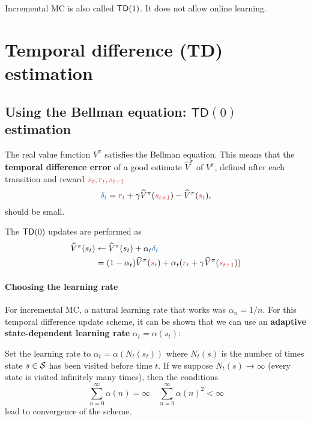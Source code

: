 \documentclass[../course-notes.tex]{subfiles}
\begin{document}
Incremental MC is also called $\mathsf{TD}(1)$. It does not allow online learning.



\section{Temporal difference (TD) estimation}

\subsection{Using the Bellman equation: $\mathsf{TD}(0)$ estimation}

The real value function $V^\pi$ satisfies the Bellman equation. This means that the \textbf{\bluefont temporal difference error} of a good estimate $\widehat{V}^\pi$ of $V^\pi$, defined after each transition and reward ${\redfont s_t,r_t,s_{t+1}}$
\begin{equation}\label{eq:ValueTDerror}
	{\bluefont\delta_t} = {\redfont r_t} + \gamma \widehat{V}^\pi({\redfont s_{t+1}}) - \widehat{V}^\pi({\redfont s_t}),
\end{equation}
should be small.

The $\mathsf{TD}(0)$ updates are performed as
\begin{align*}
	\widehat{V}^\pi(s_t) &\leftarrow
	\widehat{V}^\pi(s_t) + \alpha_t {\bluefont \delta_t} \\
	&= (1 - \alpha_t)\widehat{V}^\pi({\redfont s_t}) + \alpha_t ({\redfont r_t} + \gamma \widehat{V}^\pi({\redfont s_{t+1}}))
\end{align*}

\paragraph{Choosing the learning rate} For incremental MC, a natural learning rate that works was $\alpha_n = 1/n$. For this temporal difference update scheme, it can be shown that we can use an \textbf{adaptive state-dependent learning rate} $\alpha_t = \alpha(s_t)$:
\begin{prop}\label{prop:ValueTD0learningRate}
	Set the learning rate to $\alpha_t = \alpha(N_t(s_t))$ where $N_t(s)$ is the number of times state $s\in\mathcal{S}$ has been visited before time $t$. If we suppose $N_t(s) \to \infty$ (every state is visited infinitely many times), then the conditions
	\begin{equation}
	\sum_{n=0}^{\infty} \alpha(n) = \infty \quad
	\sum_{n=0}^{\infty} \alpha(n)^2 < \infty
	\end{equation}
	lead to convergence of the scheme.
\end{prop}
\end{document}
